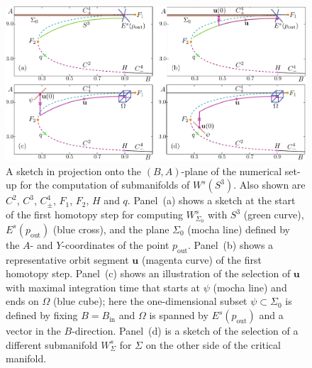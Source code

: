 \documentclass{ws-ijbc}
\begin{document}
\begin{figure}[t!]
\centering
\includegraphics[]{./figures/MKMO_3.pdf}
\caption{A sketch in projection onto the $(B,A)$-plane of the numerical set-up for the computation of submanifolds of $W^s(S^3)$.  Also shown are $C^2$, $C^3$, $C^4_\pm$, $F_1$, $F_2$, $H$ and $q$.  Panel~(a) shows a sketch at the start of the first homotopy step for computing $W^{s}_{\Sigma_0}$ with $S^3$ (green curve), $E^s(p_{\text{out}})$ (blue cross), and the plane $\Sigma_0$ (mocha line) defined by the $A$- and $Y$-coordinates of the point $p_{\text{out}}$.  Panel~(b) shows a representative orbit segment $\mathbf{u}$ (magenta curve) of the first homotopy step.  Panel~(c) shows an illustration of the selection of $\mathbf{u}$ with maximal integration time that starts at $\psi$ (mocha line) and ends on $\Omega$ (blue cube); here the one-dimensional subset $\psi \subset \Sigma_0$ is defined by fixing $B = B_{\text{in}}$ and $\Omega$ is spanned by $E^s(p_{\text{out}})$ and a vector in the $B$-direction. Panel~(d) is a sketch of the selection of a different submanifold $W^{s}_{\Sigma}$ for $\Sigma$ on the other side of the critical manifold.}
\label{figure_3}
\end{figure}
\end{document}
